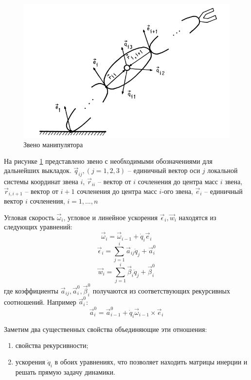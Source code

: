 	\begin{figure}[H]
	\center\includegraphics[width=0.8\linewidth]{3.png}
	\caption{Звено манипулятора}
	\label{fig:scr3}
	\end{figure}

На рисунке \ref{fig:scr3} представлено звено с необходимыми обозначениями для дальнейших выкладок. $\vec q_{ij}, (j=1,2,3)$ -- единичный вектор оси $j$ локальной системы координат звена $i$, $\vec r_{ii}$ -- вектор от $i$ сочленения до центра масс $i$ звена, $\vec r_{i, i+1}$ -- вектор от $i+1$ сочленения до центра масс $i$-ого звена, $\vec e_i$ -- единичный вектор $i$ сочленения, $i = 1,..., n$ 

Угловая скорость $\vec \omega_i$, угловое и линейное ускорения $\vec \epsilon_i, \vec w_i$ находятся из следующих уравнений:
\begin{equation}
\vec \omega_i = \vec \omega_{i-1} + \dot q_i \vec e_i
\end{equation}
\begin{equation}
\vec \epsilon_i = \sum_{j=1}^{i} \vec a_{ij} \ddot q_j + \vec a_i^0
\end{equation}
\begin{equation}
\vec w_i = \sum_{j=1}^{i} \vec \beta_i \ddot q_j + \vec \beta_i^0
\end{equation}
где коэффициенты $\vec a_{ij}, \vec a_i^0, \vec \beta_i^0$ получаются из соответствующих рекурсивных соотношений. Например $\vec a_i^0$:
\begin{equation}
\vec a_i^0 = \vec a_{i-1}^0 + \dot q_i \vec \omega_{i-1} \times \vec e_i
\end{equation}

Заметим два существенных свойства объединяющие эти отношения:
\begin{enumerate}
\item свойства рекурсивности;
\item ускорения $\ddot q_i$ в обоих уравнениях, что позволяет находить матрицы инерции и решать прямую задачу динамики.
\end{enumerate}

